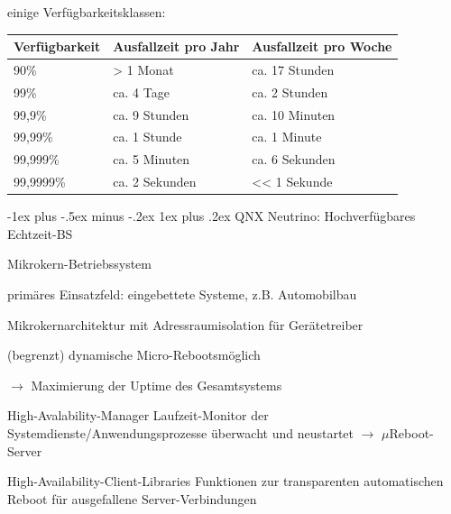 \documentclass[a4paper]{article}
\makeatletter
\renewcommand{\subsubsection}{\@startsection{subsubsection}{3}{0mm}%
 {-1ex plus -.5ex minus -.2ex}%
 {1ex plus .2ex}%
 {\normalfont\small\bfseries}}
\makeatother
\begin{document}
\begin{multicols}{3}
    einige Verfügbarkeitsklassen:
    \begin{tabular}{l|l|l}
        Verfügbarkeit & Ausfallzeit pro Jahr   & Ausfallzeit pro Woche          \\\hline
        90\%          & \textgreater{} 1 Monat & ca. 17 Stunden                 \\
        99\%          & ca. 4 Tage             & ca. 2 Stunden                  \\
        99,9\%        & ca. 9 Stunden          & ca. 10 Minuten                 \\
        99,99\%       & ca. 1 Stunde           & ca. 1 Minute                   \\
        99,999\%      & ca. 5 Minuten          & ca. 6 Sekunden                 \\
        99,9999\%     & ca. 2 Sekunden         & \textless\textless{} 1 Sekunde
    \end{tabular}

    \subsubsection{QNX Neutrino: Hochverfügbares Echtzeit-BS}
    \begin{itemize*}
        \item Mikrokern-Betriebssystem
        \item primäres Einsatzfeld: eingebettete Systeme, z.B. Automobilbau
        \item Mikrokernarchitektur mit Adressraumisolation für Gerätetreiber
        \item (begrenzt) dynamische Micro-Rebootsmöglich
        \item $\rightarrow$ Maximierung der Uptime des Gesamtsystems
    \end{itemize*}
    \begin{description*}
        \item[High-Avalability-Manager] Laufzeit-Monitor der Systemdienste/Anwendungsprozesse überwacht und neustartet $\rightarrow$ $\mu$Reboot-Server
        \item[High-Availability-Client-Libraries] Funktionen zur transparenten automatischen Reboot für ausgefallene Server-Verbindungen
    \end{description*}

    \pagebreak

\end{multicols}
\end{document}
